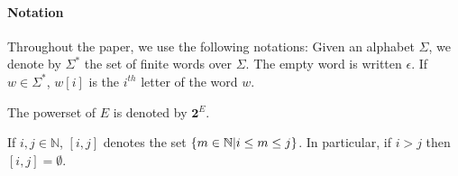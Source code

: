 \paragraph{Notation} Throughout the paper, we use the following
notations: Given an alphabet $\Sigma$, we denote by $\Sigma^*$
 the set of finite words over $\Sigma$. The empty word is written $\epsilon$. If $w\in \Sigma^*$, $w[i]$ is the $i^{th}$ letter of the word $w$.

The powerset of $E$ is denoted by $\mathbf 2^E$.

If $i, j \in \mathbb{N}$, $[i,j]$ denotes the set $\{m \in \mathbb{N} | i\leq m\leq j\}$. In particular, if $ i>j$ then $[i,j]=\emptyset$.  